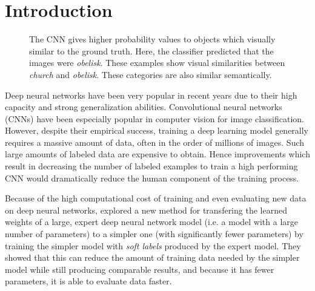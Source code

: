 \section{Introduction}


\begin{figure}[t]
  \centering



  \caption{
    The CNN gives higher probability values to objects which visually similar to
    the ground truth. Here, the classifier predicted that the images were
    \emph{obelisk}. These examples show visual similarities between
    \emph{church} and \emph{obelisk}. These categories are also similar
    semantically.
  }
  \label{fig:qualitative_results}
\end{figure}


Deep neural networks have been very popular in recent years due to their high
capacity and strong generalization abilities.  Convolutional neural networks
(CNNs) have been especially popular in computer vision for image classification.
However, despite their empirical success, training a deep learning model
generally requires a massive amount of data, often in the order of millions of
images. Such large amounts of labeled data are expensive to obtain. Hence 
improvements which result in decreasing the number of labeled examples to train
a high performing CNN would dramatically reduce the human component of the
training process.

Because of the high computational cost of training and even evaluating new data
on deep neural networks, \cite{hinton2015distilling} explored a new method
for transfering the learned weights of a large, expert deep neural network model
(i.e. a model with a large number of parameters) to a simpler one (with
significantly fewer parameters) by training the simpler model with \emph{soft
labels} produced by the expert model. They showed that this can reduce the
amount of training data needed by the simpler model while still producing
comparable results, and because it has fewer parameters, it is able to evaluate
data faster.

